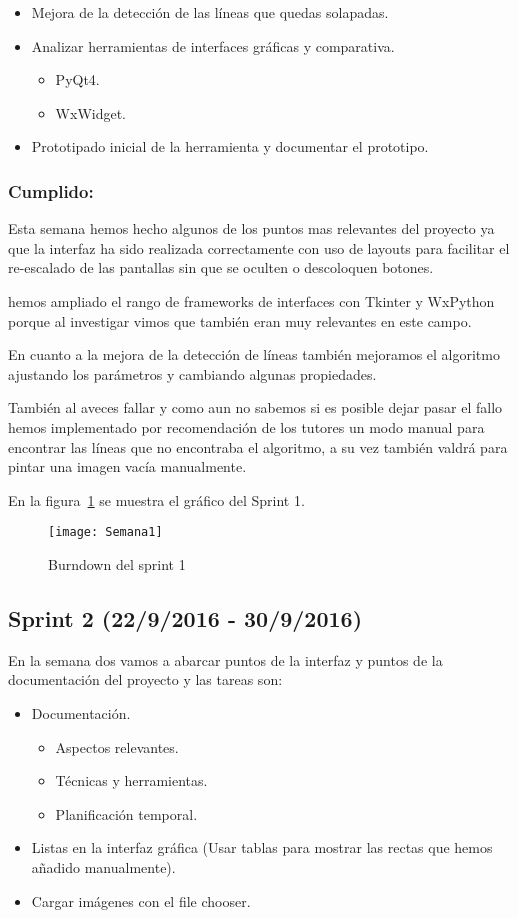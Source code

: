 \begin{itemize}
\item Mejora de la detección de las líneas que quedas solapadas. 
\item Analizar herramientas de interfaces gráficas y comparativa.
	\begin{itemize}
	\item PyQt4. 
	\item WxWidget.
	\end{itemize}
\item Prototipado inicial de la herramienta y documentar el prototipo.
\end{itemize}



\subsubsection{Cumplido:}
Esta semana hemos hecho algunos de los puntos mas relevantes del proyecto ya que la interfaz ha sido realizada correctamente con uso de layouts para facilitar el re-escalado de las pantallas sin que se oculten o descoloquen botones.

hemos ampliado el rango de frameworks de interfaces con Tkinter y WxPython porque al investigar vimos que también eran muy relevantes en este campo.

En cuanto a la mejora de la detección de líneas también mejoramos el algoritmo ajustando los parámetros y cambiando algunas propiedades.

También al aveces fallar y como aun no sabemos si es posible dejar pasar el fallo hemos implementado por recomendación de los tutores un modo manual para encontrar las líneas que no encontraba el algoritmo, a su vez también valdrá para pintar una imagen vacía manualmente.

En la figura~\ref{fig:A.2.1} se muestra el gráfico del Sprint 1.
\begin{figure}[h]
\centering
\texttt{[image: Semana1]}
\caption{Burndown del sprint 1}
\label{fig:A.2.1}
\end{figure}

\subsection{Sprint 2 (22/9/2016 - 30/9/2016)}
En la semana dos vamos a abarcar puntos de la interfaz y puntos de la documentación del proyecto y las tareas son:
 
\begin{itemize}
\item Documentación. 
\begin{itemize}
	\item Aspectos relevantes. 
	\item Técnicas y herramientas.
	\item Planificación temporal.
	\end{itemize}
\item Listas en la interfaz gráfica (Usar tablas para mostrar las rectas que hemos añadido manualmente).
\item Cargar imágenes con el file chooser.
\end{itemize}

